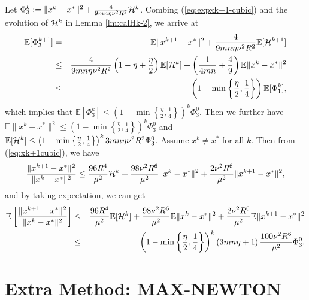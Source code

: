 \documentclass[10pt]{article}
\newcommand{\eqdef}{\; { := }\;}
\begin{document}
Let $\Phi_3^k \eqdef \|x^{k} - x^*\|^2 + \frac{4}{9mn\eta  \nu^2 R^2} {\cal H}^{k}$. Combing (\ref{eq:expxk+1-cubic}) and the evolution of ${\cal H}^k$ in Lemma \ref{lm:calHk-2}, we arrive at 
\begin{eqnarray*}
	\mathbb{E}[\Phi_3^{k+1}] &=& \mathbb{E}\|x^{k+1} - x^*\|^2 + \frac{4}{9mn\eta  \nu^2 R^2}  \mathbb{E}[{\cal H}^{k+1}] \\ 
	&\leq&  \frac{4}{9mn \eta \nu^2 R^2} \left(  1 - \eta + \frac{\eta}{2}  \right) \mathbb{E}[{\cal H}^k] + \left(  \frac{1}{4mn} + \frac{4}{9}  \right) \mathbb{E}\|x^k - x^*\|^2 \\ 
	&\leq& \left(  1 - \min \left\{  \frac{\eta}{2}, \frac{1}{4}  \right\}  \right) \mathbb{E}[\Phi_1^k], 
\end{eqnarray*}
which implies that $\mathbb{E}[\Phi_3^k] \leq  \left(  1 - \min \left\{  \frac{\eta}{2}, \frac{1}{4}  \right\}  \right)^k \Phi_3^0$. Then we further have $\mathbb{E}\|x^k - x^*\|^2 \leq  \left(  1 - \min \left\{  \frac{\eta}{2}, \frac{1}{4}  \right\}  \right)^k \Phi_3^0$ and $\mathbb{E}[{\cal H}^k] \leq  \left(  1 - \min \left\{  \frac{\eta}{2}, \frac{1}{4}  \right\}  \right)^k 3mn\eta \nu^2 R^2 \Phi_3^0$. Assume $x^k \neq x^*$ for all $k$. Then from (\ref{eq:xk+1cubic}), we have 
$$
\frac{\|x^{k+1} - x^*\|^2}{\|x^k - x^*\|^2 } \leq \frac{96R^4}{ \mu^2} {\cal H}^k + \frac{98 \nu^2 R^6}{\mu^2}\|x^k - x^*\|^2 + \frac{2\nu^2 R^6}{\mu^2} \|x^{k+1} - x^*\|^2, 
$$
and by taking expectation, we can get 
\begin{eqnarray*}
	\mathbb{E} \left[  \frac{\|x^{k+1} - x^*\|^2}{\|x^k - x^*\|^2 }  \right] &\leq& \frac{96R^4}{ \mu^2} \mathbb{E} [{\cal H}^k] + \frac{98 \nu^2 R^6}{\mu^2} \mathbb{E}\|x^k - x^*\|^2 + \frac{2\nu^2 R^6}{\mu^2}\mathbb{E} \|x^{k+1} - x^*\|^2 \\ 
	&\leq& \left(  1 - \min \left\{  \frac{\eta}{2}, \frac{1}{4}  \right\}  \right)^k  \left(  {3mn\eta} + 1  \right) \frac{100\nu^2 R^6}{\mu^2} \Phi_3^0. 
\end{eqnarray*}


\clearpage
\section{Extra Method: {\sf MAX-NEWTON}} \label{sec:maxNewton}


\end{document}
